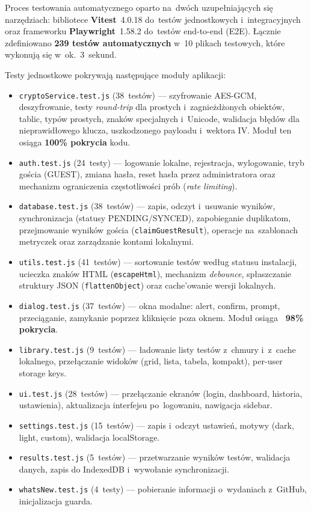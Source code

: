 \documentclass[12pt, a4paper, oneside]{report}
\begin{document}
Proces testowania automatycznego oparto na~dwóch uzupełniających się narzędziach:
bibliotece \textbf{Vitest}~4.0.18 do~testów jednostkowych i~integracyjnych oraz
frameworku \textbf{Playwright}~1.58.2 do~testów end-to-end (E2E).
Łącznie zdefiniowano \textbf{239 testów automatycznych} w~10 plikach testowych,
które wykonują się w~ok.~3~sekund.

Testy jednostkowe pokrywają następujące moduły aplikacji:

\begin{itemize}[noitemsep]
	\item \texttt{cryptoService.test.js} (38~testów) --- szyfrowanie AES-GCM,
	      deszyfrowanie, testy \textit{round-trip} dla prostych i~zagnieżdżonych
	      obiektów, tablic, typów prostych, znaków specjalnych i~Unicode,
	      walidacja błędów dla nieprawidłowego klucza, uszkodzonego payloadu
	      i~wektora IV. Moduł ten osiąga \textbf{100\% pokrycia} kodu.
	\item \texttt{auth.test.js} (24~testy) --- logowanie lokalne, rejestracja,
	      wylogowanie, tryb gościa (GUEST), zmiana hasła, reset hasła przez
	      administratora oraz mechanizm ograniczenia częstotliwości prób
	      (\textit{rate limiting}).
	\item \texttt{database.test.js} (38~testów) --- zapis, odczyt i~usuwanie
	      wyników, synchronizacja (statusy PENDING/SYNCED), zapobieganie
	      duplikatom, przejmowanie wyników gościa (\texttt{claimGuestResult}),
	      operacje na~szablonach metryczek oraz zarządzanie kontami lokalnymi.
	\item \texttt{utils.test.js} (41~testów) --- sortowanie testów według
	      statusu instalacji, ucieczka znaków HTML (\texttt{escapeHtml}),
	      mechanizm \textit{debounce}, spłaszczanie struktury JSON
	      (\texttt{flattenObject}) oraz cache'owanie wersji lokalnych.
	\item \texttt{dialog.test.js} (37~testów) --- okna modalne: alert, confirm,
	      prompt, przeciąganie, zamykanie poprzez kliknięcie poza oknem.
	      Moduł osiąga \textbf{~98\% pokrycia}.
	\item \texttt{library.test.js} (9~testów) --- ładowanie listy testów
	      z~chmury i~z~cache lokalnego, przełączanie widoków (grid, lista,
	      tabela, kompakt), per-user storage keys.
	\item \texttt{ui.test.js} (28~testów) --- przełączanie ekranów (login,
	      dashboard, historia, ustawienia), aktualizacja interfejsu po~logowaniu,
	      nawigacja sidebar.
	\item \texttt{settings.test.js} (15~testów) --- zapis i~odczyt ustawień,
	      motywy (dark, light, custom), walidacja localStorage.
	\item \texttt{results.test.js} (5~testów) --- przetwarzanie wyników testów,
	      walidacja danych, zapis do IndexedDB i~wywołanie synchronizacji.
	\item \texttt{whatsNew.test.js} (4~testy) --- pobieranie informacji
	      o~wydaniach z~GitHub, inicjalizacja guarda.
\end{itemize}
\end{document}
